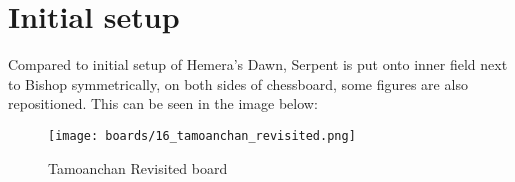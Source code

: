 \clearpage %

\section*{Initial setup}
\label{sec:Tamoanchan Revisited/Initial setup}

Compared to initial setup of Hemera's Dawn, Serpent is put onto inner field next
to Bishop symmetrically, on both sides of chessboard, some figures are also
repositioned. This can be seen in the image below:

\noindent
\begin{figure}[h]
\texttt{[image: boards/16\_tamoanchan\_revisited.png]}
\caption{Tamoanchan Revisited board}
\label{fig:16_tamoanchan_revisited}
\end{figure}

\clearpage %
